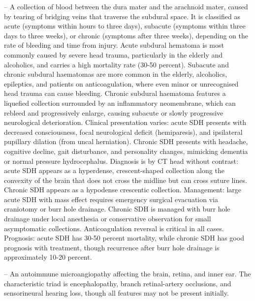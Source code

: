 -- A collection of blood between the dura mater and the arachnoid mater, caused by tearing of bridging veins that traverse the subdural space. It is classified as acute (symptoms within hours to three days), subacute (symptoms within three days to three weeks), or chronic (symptoms after three weeks), depending on the rate of bleeding and time from injury. Acute subdural hematoma is most commonly caused by severe head trauma, particularly in the elderly and alcoholics, and carries a high mortality rate (30-50 percent). Subacute and chronic subdural haematomas are more common in the elderly, alcoholics, epileptics, and patients on anticoagulation, where even minor or unrecognised head trauma can cause bleeding. Chronic subdural haematoma features a liquefied collection surrounded by an inflammatory neomembrane, which can rebleed and progressively enlarge, causing subacute or slowly progressive neurological deterioration. Clinical presentation varies: acute SDH presents with decreased consciousness, focal neurological deficit (hemiparesis), and ipsilateral pupillary dilation (from uncal herniation). Chronic SDH presents with headache, cognitive decline, gait disturbance, and personality changes, mimicking dementia or normal pressure hydrocephalus. Diagnosis is by CT head without contrast: acute SDH appears as a hyperdense, crescent-shaped collection along the convexity of the brain that does not cross the midline but can cross suture lines. Chronic SDH appears as a hypodense crescentic collection. Management: large acute SDH with mass effect requires emergency surgical evacuation via craniotomy or burr hole drainage. Chronic SDH is managed with burr hole drainage under local anesthesia or conservative observation for small asymptomatic collections. Anticoagulation reversal is critical in all cases. Prognosis: acute SDH has 30-50 percent mortality, while chronic SDH has good prognosis with treatment, though recurrence after burr hole drainage is approximately 10-20 percent.

-- An autoimmune microangiopathy affecting the brain, retina, and inner ear. The characteristic triad is encephalopathy, branch retinal-artery occlusions, and sensorineural hearing loss, though all features may not be present initially.

